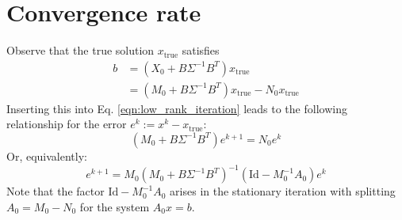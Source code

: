 \documentclass[11pt]{article}
\newcommand{\xtrue}{x_{\text{true}}}
\begin{document}
\section{Convergence rate}
Observe that the true solution $\xtrue$ satisfies
\begin{equation}
    \begin{aligned}
        b & = (X_0 + B\Sigma^{-1}B^T)\xtrue               \\
          & = (M_0 + B\Sigma^{-1}B^T) \xtrue - N_0 \xtrue
    \end{aligned}
\end{equation}
Inserting this into Eq. \eqref{eqn:low_rank_iteration} leads to the following relationship for the error $e^k:= x^k-\xtrue$:
\begin{equation}
    (M_0 + B\Sigma^{-1}B^T)e^{k+1} = N_0 e^k
\end{equation}
Or, equivalently:
\begin{equation}
    e^{k+1} = M_0\left(M_0 + B\Sigma^{-1}B^T\right)^{-1} \left(\text{Id}-M_0^{-1}A_0\right) e^k
\end{equation}
Note that the factor $\text{Id} - M_0^{-1}A_0$ arises in the stationary iteration with splitting $A_0=M_0-N_0$ for the system $A_0x=b$.
\end{document}
